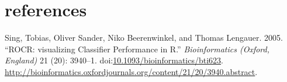 \documentclass[]{article}
\begin{document}
\listoffigures
\newpage

\section{references}\label{references}

\twocolumn

Sing, Tobias, Oliver Sander, Niko Beerenwinkel, and Thomas Lengauer.
2005. ``ROCR: visualizing Classifier Performance in R.''
\emph{Bioinformatics (Oxford, England)} 21 (20): 3940--1.
doi:\href{http://dx.doi.org/10.1093/bioinformatics/bti623}{10.1093/bioinformatics/bti623}.
\url{http://bioinformatics.oxfordjournals.org/content/21/20/3940.abstract}.
\end{document}
